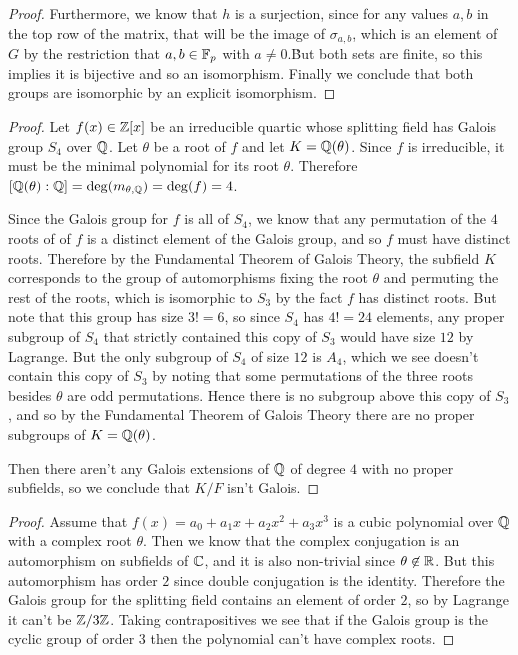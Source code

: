 \documentclass[11pt]{article}
\begin{document}
\begin{proof}
  Furthermore, we know that $h$ is a surjection, since for any values $a,b$ in the top row of the matrix, that will be the image of $\sigma_{a,b}$, which is an element of $G$ by the restriction that $a,b \in \mathbb{F}_p$ with $a \ne 0$.\.
  But both sets are finite, so this implies it is bijective and so an isomorphism.
  Finally we conclude that both groups are isomorphic by an explicit isomorphism.
\end{proof}


\begin{proof}
  Let $f(x) \in \mathbb{Z}[x]$ be an irreducible quartic whose splitting field has Galois group $S_4$ over $\mathbb{Q}$.
  Let $\theta$ be a root of $f$ and let $K = \mathbb{Q}(\theta)$.
  Since $f$ is irreducible, it must be the minimal polynomial for its root $\theta$.
  Therefore $[\mathbb{Q}(\theta) : \mathbb{Q}] = \deg(m_{\theta,\mathbb{Q}}) = \deg(f) = 4$.

  Since the Galois group for $f$ is all of $S_4$, we know that any permutation of the $4$ roots of of $f$ is a distinct element of the Galois group, and so $f$ must have distinct roots.
  Therefore by the Fundamental Theorem of Galois Theory, the subfield $K$ corresponds to the group of automorphisms fixing the root $\theta$ and permuting the rest of the roots, which is isomorphic to $S_3$ by the fact $f$ has distinct roots.
  But note that this group has size $3! = 6$, so since $S_4$ has $4! = 24$ elements, any proper subgroup of $S_4$ that strictly contained this copy of $S_3$ would have size $12$ by Lagrange.
  But the only subgroup of $S_4$ of size $12$ is $A_4$, which we see doesn't contain this copy of $S_3$ by noting that some permutations of the three roots besides $\theta$ are odd permutations.
  Hence there is no subgroup above this copy of $S_3$, and so by the Fundamental Theorem of Galois Theory there are no proper subgroups of $K = \mathbb{Q}(\theta)$.

  Then there aren't any Galois extensions of $\mathbb{Q}$ of degree $4$ with no proper subfields, so we conclude that $K/F$ isn't Galois.
\end{proof}


\begin{proof}
  Assume that $f(x) = a_0 + a_1x + a_2x^2 + a_3x^3$ is a cubic polynomial over $\mathbb{Q}$ with a complex root $\theta$.
  Then we know that the complex conjugation is an automorphism on subfields of $\mathbb{C}$, and it is also non-trivial since $\theta \not \in \mathbb{R}$.
  But this automorphism has order $2$ since double conjugation is the identity.
  Therefore the Galois group for the splitting field contains an element of order $2$, so by Lagrange it can't be $\mathbb{Z}/3\mathbb{Z}$.
  Taking contrapositives we see that if the Galois group is the cyclic group of order $3$ then the polynomial can't have complex roots.
\end{proof}
\end{document}
